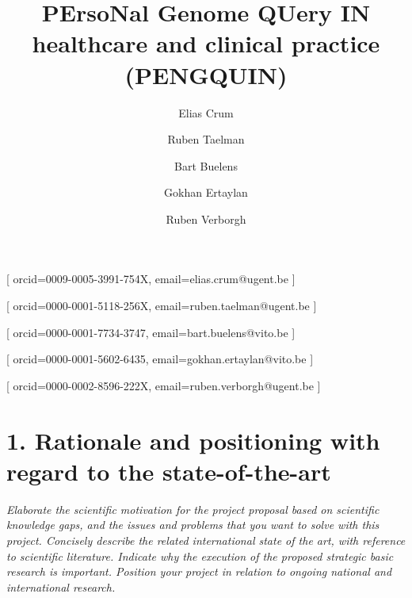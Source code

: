 \documentclass{article}
\begin{document}
\title{PErsoNal Genome QUery IN healthcare and clinical practice (PENGQUIN)}
\author[1,2]{Elias Crum}[
orcid=0009-0005-3991-754X,
email=elias.crum@ugent.be
]
\cormark[1]

\author[1]{Ruben Taelman}[
orcid=0000-0001-5118-256X,
email=ruben.taelman@ugent.be
]

\author[2]{Bart Buelens}[
orcid=0000-0001-7734-3747,
email=bart.buelens@vito.be
]

\author[2]{Gokhan Ertaylan}[
orcid=0000-0001-5602-6435,
email=gokhan.ertaylan@vito.be
]

\author[1]{Ruben Verborgh}[
orcid=0000-0002-8596-222X,
email=ruben.verborgh@ugent.be
]

\address [1] {IDLab, Department of Electronics and Information Systems, Ghent University -- imec, Belgium}
\address [2] {Flemish institute for Technological Research (VITO) Mol, Belgium}



\maketitle


\section{1. Rationale and positioning with regard to the state-of-the-art}
\textit{Elaborate the scientific motivation for the project proposal based on scientific knowledge gaps, and the issues and problems that you want to solve with this project. Concisely describe the related international state of the art, with reference to scientific literature. Indicate why the execution of the proposed strategic basic research is important. Position your project in relation to ongoing national and international research.} 

\end{document}
